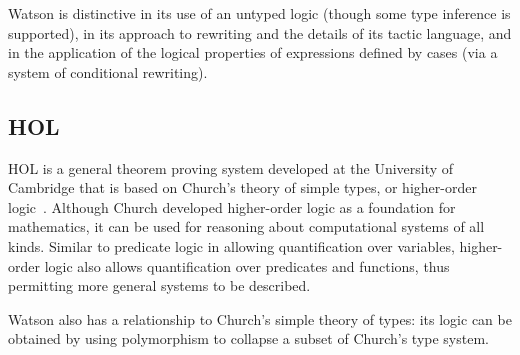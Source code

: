 \documentclass{kluwer}
\begin{document}
\begin{article}
Watson is distinctive in its use of an untyped logic (though some type
inference is supported), in its approach to rewriting and the details
of its tactic language, and in the application of the logical
properties of expressions defined by cases (via a system of
conditional rewriting).


\subsection{HOL}
HOL is a general theorem proving system developed at the University of
Cambridge \cite{Gordon87,Camilleri87,hol} that is based on Church's theory of
simple types, or higher-order logic~\cite{Church40}. Although Church
developed higher-order logic as a foundation for mathematics, it can be
used for reasoning about computational systems of all kinds.  Similar to
predicate logic in allowing quantification over variables, higher-order
logic also allows quantification over predicates and functions, thus
permitting more general systems to be described. 

Watson also has a relationship to Church's simple theory of types: its
logic can be obtained by using polymorphism to collapse a subset of
Church's type system.


\end{article}
\end{document}
